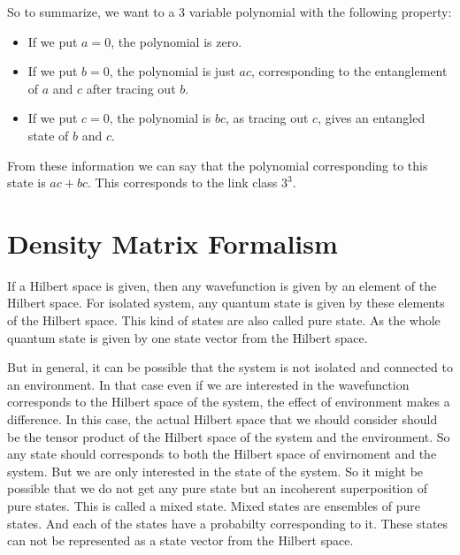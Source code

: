 \documentclass{amsart}
\theoremstyle{plain}
\theoremstyle{definition}
\theoremstyle{plain}
\begin{document}
 So to summarize, we want to a 3 variable polynomial with the following property:
	\begin{itemize}
		\item If we put $a = 0$, the polynomial is zero.
		\item If we put $b = 0$, the polynomial is just $ac$, corresponding to the entanglement of $a$ and $c$ after tracing out $b$.
		\item If we put $c = 0$, the polynomial is $bc$, as tracing out $c$, gives an entangled state of $b$ and $c$.
	\end{itemize}
	From these information we can say that the polynomial corresponding to this state is $ac + bc$. This corresponds to the link class $3^3$.
    
\section{Density Matrix Formalism}
If a Hilbert space is given, then any wavefunction is given by an element of the Hilbert space. For isolated system, any quantum state is given by these elements of the Hilbert space. This kind of states are also called pure state. As the whole quantum state is given by one state vector from the Hilbert space.

But in general, it can be possible that the system is not isolated and connected to an environment. In that case even if we are interested in the wavefunction corresponds to the Hilbert space of the system, the effect of environment makes a difference. In this case, the actual Hilbert space that we should consider should be the tensor product of the Hilbert space of the system and the environment. So any state should corresponds to both the Hilbert space of envirnoment and the system. But we are only interested in the state of the system. So it might be possible that we do not get any pure state but an incoherent superposition of pure states. This is called a mixed state. Mixed states are ensembles of pure states. And each of the states have a probabilty corresponding to it. These states can not be represented as a state vector from the Hilbert space.
\end{document}
